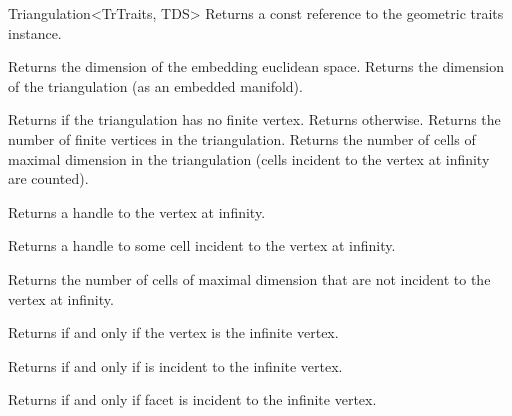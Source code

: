 \begin{ccRefClass}{Triangulation<TrTraits, TDS>}
%
{Returns a const reference to the geometric traits instance.}

%
{Returns the dimension of the embedding euclidean space.}
\ccGlue
{}%
{Returns the dimension of the triangulation (as an embedded manifold).}

%
{Returns  if the triangulation has no finite vertex. Returns
 otherwise.}
\ccGlue
{}%
{Returns the number of finite vertices in the triangulation.}
\ccGlue
{}%
{Returns the number of cells of maximal dimension in the triangulation
(cells incident to the vertex at infinity are counted).}

%
{Returns a handle to the vertex at infinity.}

%
{Returns a handle to some cell incident to the vertex at infinity.}


%
{Returns the number of cells of maximal dimension that are not
  incident to the vertex at infinity.}


{Returns  if and only if the vertex  is the infinite vertex.}

\ccGlue

{Returns  if and only if  is incident to the infinite vertex.
}

\ccGlue

{Returns  if and only if facet  is incident to the infinite
vertex. 
}

\ccGlue



\end{ccRefClass}
